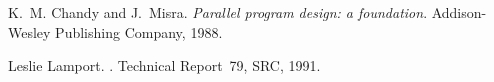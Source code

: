 \documentclass[11pt]{thesul}
\begin{document}
    \twocolumn
    \PrintGlossary


    \PrintIndex

    \onecolumn


    \begin{thebibliography}{Lam91a}

        K.~M. Chandy and J.~Misra.
        \newblock \emph{Parallel program design: a foundation}.
        \newblock Addison-Wesley Publishing Company, 1988.

        Leslie Lamport.
        .
        \newblock Technical Report~79, SRC, 1991.

    \end{thebibliography}


\end{document}
